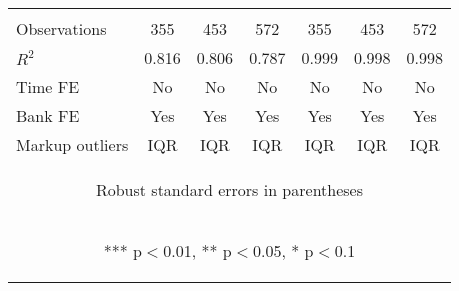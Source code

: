 \begin{tabular}{lcccccc}
\vspace{4pt} & \begin{footnotesize}\end{footnotesize} & \begin{footnotesize}\end{footnotesize} & \begin{footnotesize}\end{footnotesize} & \begin{footnotesize}\end{footnotesize} & \begin{footnotesize}\end{footnotesize} & \begin{footnotesize}\end{footnotesize} \\
Observations & 355 & 453 & 572 & 355 & 453 & 572 \\
$R^2$ & 0.816 & 0.806 & 0.787 & 0.999 & 0.998 & 0.998 \\
Time FE & No & No & No & No & No & No \\
Bank FE & Yes & Yes & Yes & Yes & Yes & Yes \\
 Markup outliers & IQR & IQR & IQR & IQR & IQR & IQR \\ \hline
\multicolumn{7}{c}{\begin{footnotesize} Robust standard errors in parentheses\end{footnotesize}} \\
\multicolumn{7}{c}{\begin{footnotesize} *** p$<$0.01, ** p$<$0.05, * p$<$0.1\end{footnotesize}} \\
\end{tabular}


